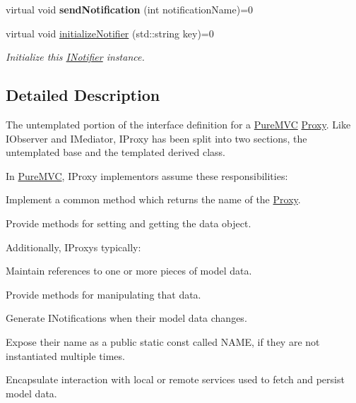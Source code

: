 \begin{DoxyCompactItemize}
\item 
\hypertarget{class_pure_m_v_c_1_1_i_notifier_aca921608a2ced017a8face049fc7c6af}{
virtual void {\bfseries sendNotification} (int notificationName)=0}
\label{class_pure_m_v_c_1_1_i_notifier_aca921608a2ced017a8face049fc7c6af}

\item 
virtual void \hyperlink{class_pure_m_v_c_1_1_i_notifier_a28d7dbbe0726d4d52080546c5d79b232}{initializeNotifier} (std::string key)=0
\begin{DoxyCompactList}\small\item\em Initialize this \hyperlink{class_pure_m_v_c_1_1_i_notifier}{INotifier} instance. \item\end{DoxyCompactList}\end{DoxyCompactItemize}


\subsection{Detailed Description}
The untemplated portion of the interface definition for a \hyperlink{namespace_pure_m_v_c}{PureMVC} \hyperlink{class_pure_m_v_c_1_1_proxy}{Proxy}. Like IObserver and IMediator, IProxy has been split into two sections, the untemplated base and the templated derived class.

In \hyperlink{namespace_pure_m_v_c}{PureMVC}, {\ttfamily IProxy} implementors assume these responsibilities: 
\begin{DoxyItemize}
\item Implement a common method which returns the name of the \hyperlink{class_pure_m_v_c_1_1_proxy}{Proxy}. 
\item Provide methods for setting and getting the data object. 
\end{DoxyItemize}

Additionally, {\ttfamily IProxy}s typically: 
\begin{DoxyItemize}
\item Maintain references to one or more pieces of model data. 
\item Provide methods for manipulating that data. 
\item Generate {\ttfamily INotifications} when their model data changes. 
\item Expose their name as a {\ttfamily public static const} called {\ttfamily NAME}, if they are not instantiated multiple times. 
\item Encapsulate interaction with local or remote services used to fetch and persist model data. 
\end{DoxyItemize}

